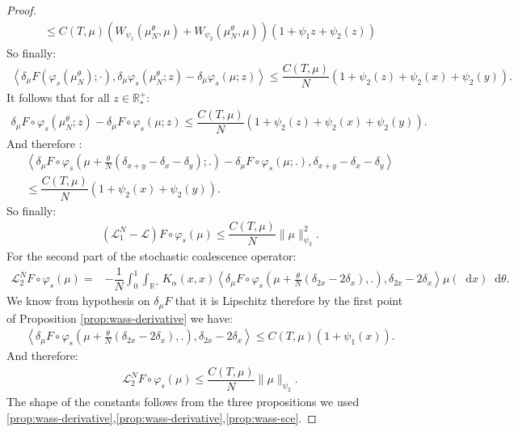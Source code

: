 \documentclass[11pt,a4paper]{article}
\newcommand{\RR}{\mathbb{R}}
\newcommand{\RRP}{\mathbb{R}^+_*}
\newcommand{\LC}{\mathcal{L}}
\newcommand{\brac}[1]{\left\langle#1\right\rangle}
\newcommand{\dd}{\mathop{}\!\mathrm{d}}
\begin{document}
\begin{proof}
\begin{multline*}
         \leq C(T,\mu) \left(W_{\psi_1}\left(\mu^\theta_N, \mu\right) + W_{\psi_2}\left(\mu^\theta_N, \mu\right) \right)(1 + \psi_1{z} + \psi_2(z))
    \end{multline*}
    So finally:
    \begin{align*}
        \brac{\delta_\mu F\left(\varphi_s\left(\mu^\theta_N\right);\cdot\right),\delta_\mu \varphi_s \left(\mu^\theta_N;z\right) - \delta_\mu \varphi_s (\mu;z)} \leq \dfrac{C(T,\mu)}{N}(1 + \psi_2(z) + \psi_2(x) + \psi_2(y)).
    \end{align*}
    It follows that for all $z \in \RRP$:
    \begin{align*}
        \delta_\mu F\circ \varphi_s\left(\mu^\theta_N;z\right) - \delta_\mu F\circ \varphi_s(\mu;z) \leq \dfrac{C(T,\mu)}{N}(1 + \psi_2(z) + \psi_2(x) + \psi_2(y)).
    \end{align*}
    And therefore :
    \begin{multline*}
        \left\langle  \delta_\mu F\circ \varphi_s\left(\mu + \frac{\theta}{N}\left(\delta_{x + y} - \delta_x - \delta_y \right);.\right)- \delta_\mu F\circ \varphi_s\left(\mu;.\right),\delta_{x+y} - \delta_x - \delta_y\right\rangle \\
        \leq \dfrac{C(T,\mu)}{N}(1 + \psi_2(x) + \psi_2(y)).
    \end{multline*}
    So finally:
    \begin{align*}
        \left(\LC_1^N - \LC\right)F\circ \varphi_s (\mu) \leq \dfrac{C(T,\mu)}{N} \|\mu\|_{\psi_3}^2.
    \end{align*}
    For the second part of the stochastic coalescence operator:
    \begin{align*}
        \LC_2^N F\circ \varphi_s(\mu) =& -\dfrac{1}{N}\int_0^1\int_{\RR^+} K_{\alpha}(x,x) 
           \left\langle  \delta_\mu F\circ \varphi_s\left(\mu + \frac{\theta}{N}\left(\delta_{2x} - 2\delta_x \right),.\right),\delta_{2x} - 2\delta_x \right\rangle\mu(\dd x)\dd\theta.
    \end{align*}
    We know from hypothesis on $\delta_\mu F$ that it is Lipschitz therefore by the first point of Proposition \ref{prop:wass-derivative} we have:
    \begin{align*}
        \left\langle  \delta_\mu F\circ \varphi_s\left(\mu + \frac{\theta}{N}\left(\delta_{2x} - 2\delta_x \right),.\right),\delta_{2x} - 2\delta_x \right\rangle \leq C(T,\mu) (1 + \psi_1(x)).
    \end{align*}
    And therefore:
    \begin{align*}
         \LC_2^N F\circ \varphi_s(\mu) \leq \dfrac{C(T,\mu)}{N} \|\mu\|_{\psi_2}.
    \end{align*}
    The shape of the constants follows from the three propositions we used \ref{prop:wass-derivative},\ref{prop:wass-derivative},\ref{prop:wass-sce}.
\end{proof}
\end{document}
